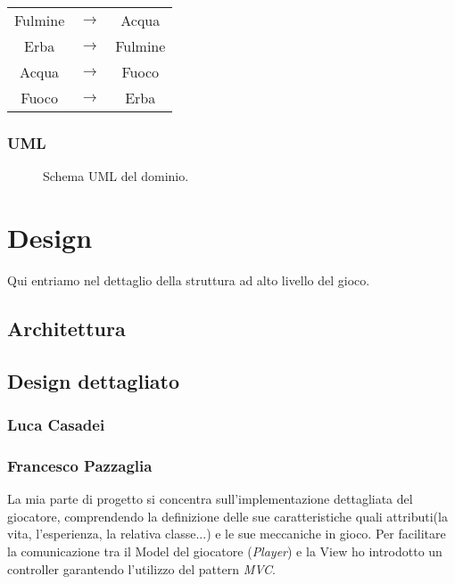 \documentclass[a4paper,12pt]{report}
\begin{document}
\begin{center}
\begin{tabular}{ c c c }
    Fulmine & $\rightarrow$ & Acqua \\
    Erba & $\rightarrow$ & Fulmine \\
    Acqua & $\rightarrow$ & Fuoco \\
    Fuoco & $\rightarrow$ & Erba \\
\end{tabular}
\end{center}

\subsection{UML}
\begin{figure}[H]
	\centering
	
	\caption{Schema UML del dominio.} \label{fig:Schema UML del dominio.}
\end{figure}

\chapter{Design}

Qui entriamo nel dettaglio della struttura ad alto livello del gioco.

\section{Architettura}
\section{Design dettagliato}

\subsection*{Luca Casadei}

\subsection*{Francesco Pazzaglia}
La mia parte di progetto si concentra sull'implementazione dettagliata del giocatore, comprendendo la definizione delle sue caratteristiche quali attributi(la vita, l'esperienza, la relativa classe...) e le sue meccaniche in gioco. Per facilitare la comunicazione tra il Model del giocatore (\textit{Player}) e la View ho introdotto un controller garantendo l'utilizzo del pattern \textit{MVC}.
\end{document}

